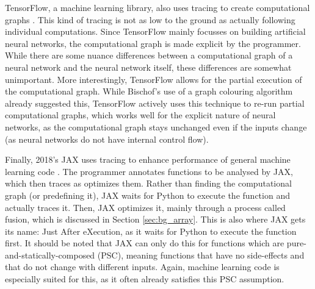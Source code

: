         TensorFlow, a machine learning library, also uses tracing to create computational graphs \cite{abadi2016tensorflow}.
        This kind of tracing is not as low to the ground as actually following individual computations.
        Since TensorFlow mainly focusses on building artificial neural networks, the computational graph is made explicit by the programmer.
        While there are some nuance differences between a computational graph of a neural network and the neural network itself, these differences are somewhat unimportant.
        More interestingly, TensorFlow allows for the partial execution of the computational graph.
        While Bischof's use of a graph colouring algorithm already suggested this, TensorFlow actively uses this technique to re-run partial computational graphs, which works well for the explicit nature of neural networks, as the computational graph stays unchanged even if the inputs change (as neural networks do not have internal control flow).

        Finally, 2018's JAX uses tracing to enhance performance of general machine learning code \cite{frostig2018compiling}.
        The programmer annotates functions to be analysed by JAX, which then traces as optimizes them.
        Rather than finding the computational graph (or predefining it), JAX waits for Python to execute the function and actually traces it.
        Then, JAX optimizes it, mainly through a process called fusion, which is discussed in Section \ref{sec:bg_array}.
        This is also where JAX gets its name: Just After eXecution, as it waits for Python to execute the function first.
        It should be noted that JAX can only do this for functions which are pure-and-statically-composed (PSC), meaning functions that have no side-effects and that do not change with different inputs.
        Again, machine learning code is especially suited for this, as it often already satisfies this PSC assumption.
        
